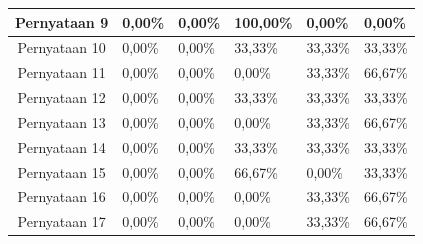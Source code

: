 \begin{table}[]
\begin{tabular}{|c|l|l|l|l|l|}
Pernyataan 9                         & 0,00\%                            & 0,00\%                           & 100,00\%                        & 0,00\%                          & 0,00\%                           \\ \hline
Pernyataan 10                        & 0,00\%                            & 0,00\%                           & 33,33\%                         & 33,33\%                         & 33,33\%                          \\ \hline
Pernyataan 11                        & 0,00\%                            & 0,00\%                           & 0,00\%                          & 33,33\%                         & 66,67\%                          \\ \hline
Pernyataan 12                        & 0,00\%                            & 0,00\%                           & 33,33\%                         & 33,33\%                         & 33,33\%                          \\ \hline
Pernyataan 13                        & 0,00\%                            & 0,00\%                           & 0,00\%                          & 33,33\%                         & 66,67\%                          \\ \hline
Pernyataan 14                        & 0,00\%                            & 0,00\%                           & 33,33\%                         & 33,33\%                         & 33,33\%                          \\ \hline
Pernyataan 15                        & 0,00\%                            & 0,00\%                           & 66,67\%                         & 0,00\%                          & 33,33\%                          \\ \hline
Pernyataan 16                        & 0,00\%                            & 0,00\%                           & 0,00\%                          & 33,33\%                         & 66,67\%                          \\ \hline
Pernyataan 17                        & 0,00\%                            & 0,00\%                           & 0,00\%                          & 33,33\%                         & 66,67\%                          \\ \hline
\end{tabular}
\end{table}

